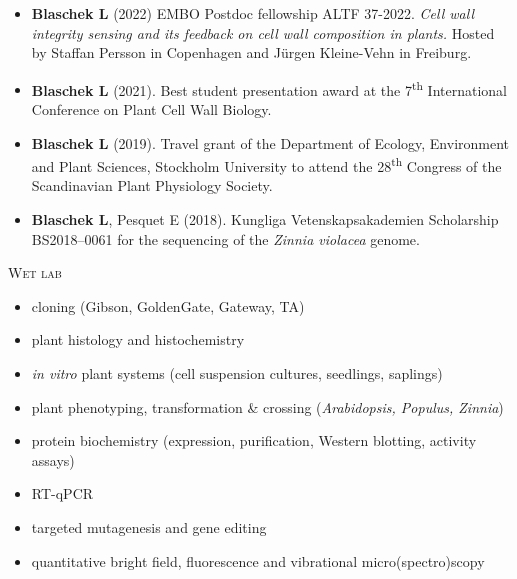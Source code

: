 \documentclass[11pt]{article}
\begin{document}
\vspace{-0.175cm}
\begin{itemize}[label={},itemindent=-9pt,leftmargin=24pt]
	\itemsep-0.1cm
	\item \textbf{Blaschek L} (2022) EMBO Postdoc fellowship ALTF 37-2022. \textit{Cell wall integrity sensing and its feedback on cell wall composition in plants.} Hosted by Staffan Persson in Copenhagen and Jürgen Kleine-Vehn in Freiburg.
	\item \textbf{Blaschek L} (2021). Best student presentation award at the 7\textsuperscript{th} International Conference on Plant Cell Wall Biology.
	\item \textbf{Blaschek L} (2019). Travel grant of the Department of Ecology, Environment and Plant Sciences, Stockholm University to attend the 28\textsuperscript{th} Congress of the Scandinavian Plant Physiology Society.
	\item \textbf{Blaschek L}, Pesquet E (2018). Kungliga Vetenskapsakademien Scholarship BS2018--0061 for the sequencing of the \textit{Zinnia violacea} genome. 
\end{itemize}
\vspace{0.3cm}


\vspace{0.3cm}

\textsc{\large{Wet lab}} 
\vspace{-0.175cm}
\begin{addmargin}[24pt]{0pt}
	\begin{multicols}{2}
		\raggedright
		\begin{itemize}[itemindent=-9pt,leftmargin=24pt]
			\itemsep-0.1cm
			\item cloning (Gibson, GoldenGate, Gateway, TA)
			\item plant histology and histochemistry
			\item \textit{in vitro} plant systems (cell suspension cultures, seedlings, saplings)
			\item plant phenotyping, transformation \& crossing (\textit{Arabidopsis, Populus, Zinnia})
			\item protein biochemistry (expression, purification, Western blotting, activity assays)
			\item RT-qPCR
			\item targeted mutagenesis and gene editing
			\item quantitative bright field, fluorescence and vibrational micro(spectro)scopy
		\end{itemize}
	\end{multicols}
\end{addmargin}
\vspace{0.2cm}
\end{document}
